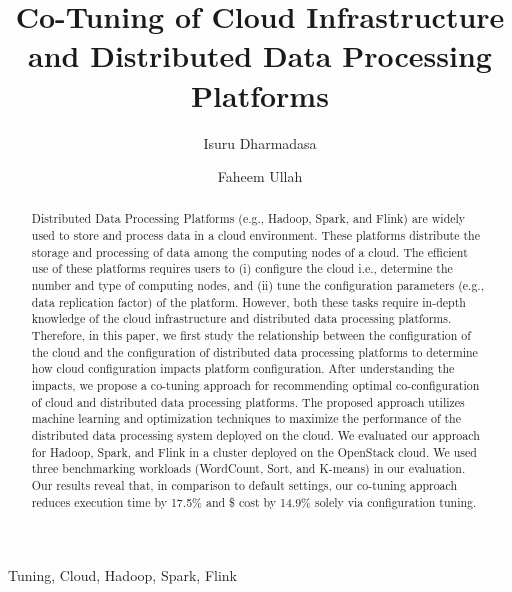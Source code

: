 \documentclass[3p]{elsarticle}
\begin{document}
\begin{frontmatter}

\title{Co-Tuning of Cloud Infrastructure and Distributed Data Processing Platforms}



\author{Isuru Dharmadasa}
\author{Faheem Ullah}

\address{The University of Adelaide, Australia}
\address{\{isuru.mahaganiarachchige, faheem.ullah\}@adelaide.edu.au}

\begin{abstract}
Distributed Data Processing Platforms (e.g., Hadoop, Spark, and Flink) are widely used to store and process data in a cloud environment. These platforms distribute the storage and processing of data among the computing nodes of a cloud. The efficient use of these platforms requires users to (i) configure the cloud i.e.,  determine the number and type of computing nodes, and (ii) tune the configuration parameters (e.g., data replication factor) of the platform. However, both these tasks require in-depth knowledge of the cloud infrastructure and distributed data processing platforms. Therefore, in this paper, we first study the relationship between the configuration of the cloud and the configuration of distributed data processing platforms to determine how cloud configuration impacts platform configuration. After understanding the impacts, we propose a co-tuning approach for recommending optimal co-configuration of cloud and distributed data processing platforms. The proposed approach utilizes machine learning and optimization techniques to maximize the performance of the distributed data processing system deployed on the cloud. We evaluated our approach for Hadoop, Spark, and Flink in a cluster deployed on the OpenStack cloud. We used three benchmarking workloads (WordCount, Sort, and K-means) in our evaluation. Our results reveal that, in comparison to default settings, our co-tuning approach reduces execution time by 17.5\% and \$ cost by 14.9\% solely via configuration tuning. 
\end{abstract}

\begin{keyword}
Tuning, Cloud, Hadoop, Spark, Flink
\end{keyword}

\end{frontmatter}
\end{document}

